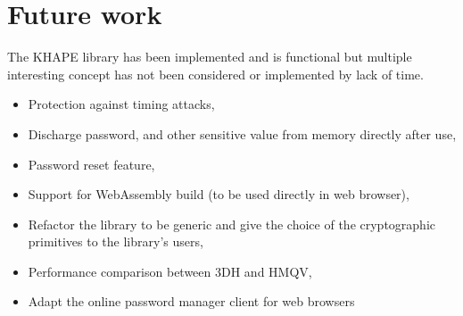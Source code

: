 \documentclass[../report.tex]{subfiles}
\begin{document}





\section{Future work}
The KHAPE library has been implemented and is functional but multiple interesting concept has not been considered or implemented by lack of time.

\begin{itemize}
 \item Protection against timing attacks,
 \item Discharge password, and other sensitive value from memory directly after use,
 \item Password reset feature,
 \item Support for WebAssembly build (to be used directly in web browser),
 \item Refactor the library to be generic and give the choice of the cryptographic primitives to the library's users,
 \item Performance comparison between 3DH and HMQV,
 \item Adapt the online password manager client for web browsers
\end{itemize}







\end{document}
